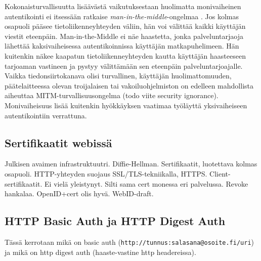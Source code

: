 \documentclass[finnish,gradu]{tktltiki}
\begin{document}
  Kokonaisturvallisuutta lisäävästä vaikutuksestaan huolimatta monivaiheinen autentikointi ei itsessään ratkaise \emph{man-in-the-middle}-ongelmaa \cite{schneier_2factor_2005}. Jos kolmas osapuoli pääsee tietoliikenneyhteyden väliin, hän voi välittää kaikki käyttäjän viestit eteenpäin. Man-in-the-Middle ei näe haastetta, jonka palveluntarjaoja lähettää kaksivaiheisessa autentikoinnissa käyttäjän matkapuhelimeen. Hän kuitenkin näkee kaapatun tietoliikenneyhteyden kautta käyttäjän haasteeseen tarjoaman vastineen ja pystyy välittämään sen eteenpäin palveluntarjoajalle. Vaikka tiedonsiirtokanava olisi turvallinen, käyttäjän huolimattomuuden, päätelaitteessa olevan troijalaisen tai vakoiluohjelmiston on edelleen mahdollista aiheuttaa MITM-turvallisuusongelma (todo viite security ignorance). Monivaiheisuus lisää kuitenkin hyökkäyksen vaatimaa työläyttä yksivaiheiseen autentikointiin verrattuna.






  \subsection{Sertifikaatit webissä} %
  \label{sub:sertifikaatit_webissä}
  Julkisen avaimen infrastruktuutri.
  Diffie-Hellman.
  Sertifikaatit, luotettava kolmas osapuoli.
  HTTP-yhteyden suojaus SSL/TLS-tekniikalla, HTTPS.
  Client-sertifikaatit. Ei vielä yleistynyt. Silti sama cert monessa eri palvelussa. Revoke hankalaa. OpenID+cert olis hyvä.
  WebID-draft.


  \subsection{HTTP Basic Auth ja HTTP Digest Auth} %
  \label{sub:http_basic_auth_ja_http_digest_auth}
  Tässä kerrotaan mikä on basic auth (\verb!http://tunnus:salasana@osoite.fi/uri!) ja mikä on http digest auth (haaste-vastine http headereissa).
\end{document}
